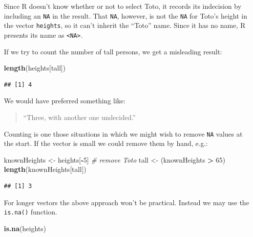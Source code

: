 \documentclass[]{book}
\makeatletter
\newenvironment{Shaded}{\begin{snugshade}}{\end{snugshade}}
\newcommand{\KeywordTok}[1]{\textcolor[rgb]{0.13,0.29,0.53}{\textbf{#1}}}
\newcommand{\DecValTok}[1]{\textcolor[rgb]{0.00,0.00,0.81}{#1}}
\newcommand{\StringTok}[1]{\textcolor[rgb]{0.31,0.60,0.02}{#1}}
\newcommand{\CommentTok}[1]{\textcolor[rgb]{0.56,0.35,0.01}{\textit{#1}}}
\newcommand{\OperatorTok}[1]{\textcolor[rgb]{0.81,0.36,0.00}{\textbf{#1}}}
\newcommand{\NormalTok}[1]{#1}
\newenvironment{kframe}{%
\medskip{}
\setlength{\fboxsep}{.8em}
 \def\at@end@of@kframe{}%
 \ifinner\ifhmode%
  \def\at@end@of@kframe{\end{minipage}}%
  \begin{minipage}{\columnwidth}%
 \fi\fi%
 \def\FrameCommand##1{\hskip\@totalleftmargin \hskip-\fboxsep
 \colorbox{shadecolor}{##1}\hskip-\fboxsep
     \hskip-\linewidth \hskip-\@totalleftmargin \hskip\columnwidth}%
 \MakeFramed {\advance\hsize-\width
   \@totalleftmargin\z@ \linewidth\hsize
   \@setminipage}}%
 {\par\unskip\endMakeFramed%
 \at@end@of@kframe}
\renewenvironment{Shaded}{\begin{kframe}}{\end{kframe}}
\theoremstyle{definition}
\theoremstyle{definition}
\theoremstyle{definition}
\theoremstyle{remark}
\makeatother
\begin{document}
Since R doesn't know whether or not to select Toto, it records its
indecision by including an \texttt{NA} in the result. That \texttt{NA},
however, is not the \texttt{NA} for Toto's height in the vector
\texttt{heights}, so it can't inherit the ``Toto'' name. Since it has no
name, R presents its name as \texttt{\textless{}NA\textgreater{}}.

If we try to count the number of tall persons, we get a misleading
result:

\begin{Shaded}
\begin{Highlighting}[]
\KeywordTok{length}\NormalTok{(heights[tall])}
\end{Highlighting}
\end{Shaded}

\begin{verbatim}
## [1] 4
\end{verbatim}

We would have preferred something like:

\begin{quote}
``Three, with another one undecided.''
\end{quote}

Counting is one those situations in which we might wish to remove
\texttt{NA} values at the start. If the vector is small we could remove
them by hand, e.g.:

\begin{Shaded}
\begin{Highlighting}[]
\NormalTok{knownHeights <-}\StringTok{ }\NormalTok{heights[}\OperatorTok{-}\DecValTok{5}\NormalTok{]  }\CommentTok{# remove Toto}
\NormalTok{tall <-}\StringTok{ }\NormalTok{(knownHeights }\OperatorTok{>}\StringTok{ }\DecValTok{65}\NormalTok{)}
\KeywordTok{length}\NormalTok{(knownHeights[tall])}
\end{Highlighting}
\end{Shaded}

\begin{verbatim}
## [1] 3
\end{verbatim}

For longer vectors the above approach won't be practical. Instead we may
use the \texttt{is.na()} function.

\begin{Shaded}
\begin{Highlighting}[]
\KeywordTok{is.na}\NormalTok{(heights)}
\end{Highlighting}
\end{Shaded}
\end{document}
